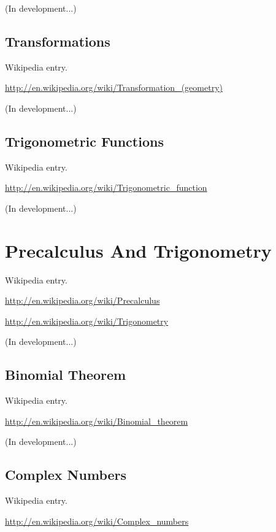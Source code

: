 \documentclass[12pt,oneside]{book}
\begin{document}
(In development...)

\subsection[Transformations]{Transformations}

Wikipedia entry.

\href{http://en.wikipedia.org/wiki/Transformation_(geometry)}{http://en.wikipedia.org/wiki/Transformation\_(geometry)}

(In development...)

\subsection[Trigonometric Functions]{Trigonometric Functions}

Wikipedia entry.

\href{http://en.wikipedia.org/wiki/Trigonometric_function}{http://en.wikipedia.org/wiki/Trigonometric\_function}

(In development...)

\section[Precalculus And Trigonometry]{Precalculus And Trigonometry}

Wikipedia entry.

\href{http://en.wikipedia.org/wiki/Precalculus}{http://en.wikipedia.org/wiki/Precalculus}


\href{http://en.wikipedia.org/wiki/Trigonometry}{http://en.wikipedia.org/wiki/Trigonometry}

(In development...)

\subsection[Binomial Theorem]{Binomial Theorem}

Wikipedia entry.

\href{http://en.wikipedia.org/wiki/Binomial_theorem}{http://en.wikipedia.org/wiki/Binomial\_theorem}

(In development...)

\subsection[Complex Numbers]{Complex Numbers}

Wikipedia entry.

\href{http://en.wikipedia.org/wiki/Complex_numbers}{http://en.wikipedia.org/wiki/Complex\_numbers}
\end{document}
